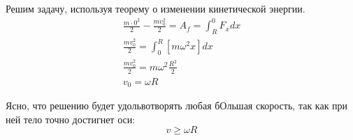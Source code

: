 \documentclass[a5paper,10pt]{article}
\makeatletter
\newif\if@gather@prefix
\newcommand*{\beforetext}[1]{%
  \ifmeasuring@\else
  \gdef\gather@prefix{#1}%
  \global\@gather@prefixtrue 
  \fi
}
\makeatother
\begin{document}
Решим задачу, используя теорему о изменении кинетической энергии.
\begin{gather}
    \frac{m\cdot0^2}{2}-\frac{mv_0^2}{2}=A_f=\int_R^0F_xdx\\
    \frac{mv_0^2}{2}=\int_0^R[m\omega^2x]dx\\
    \frac{mv_0^2}{2}=m\omega^2\frac{R^2}{2}\\
    v_0=\omega{R}
%
\end{gather}

Ясно, что решению будет удольвотворять любая бОльшая скорость, так как при ней 
тело точно достигнет оси:
\begin{equation}
    v\geq \omega{R}
\end{equation}
\end{document}
